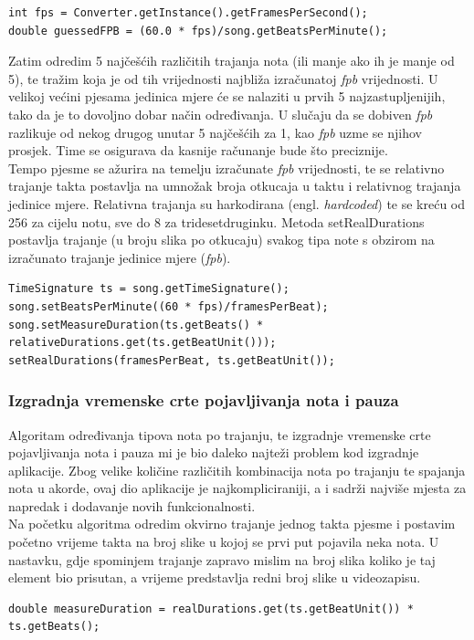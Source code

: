 \documentclass[times, utf8, zavrsni, numeric]{fer}
\begin{document}
\begin{lstlisting}
int fps = Converter.getInstance().getFramesPerSecond();
double guessedFPB = (60.0 * fps)/song.getBeatsPerMinute();
\end{lstlisting}

Zatim odredim 5 najčešćih različitih trajanja nota (ili manje ako ih je manje od 5), te tražim koja je od tih vrijednosti najbliža izračunatoj \textit{fpb} vrijednosti. U velikoj većini pjesama jedinica mjere će se nalaziti u prvih 5 najzastupljenijih, tako da je to dovoljno dobar način određivanja. U slučaju da se dobiven \textit{fpb} razlikuje od nekog drugog unutar 5 najčešćih za 1, kao \textit{fpb} uzme se njihov prosjek. Time se osigurava da kasnije računanje bude što preciznije.\\

Tempo pjesme se ažurira na temelju izračunate \textit{fpb} vrijednosti, te se relativno trajanje takta postavlja na umnožak broja otkucaja u taktu i relativnog trajanja jedinice mjere. Relativna trajanja su harkodirana (engl. \textit{hardcoded}) te se kreću od 256 za cijelu notu, sve do 8 za tridesetdruginku. Metoda setRealDurations postavlja trajanje (u broju slika po otkucaju) svakog tipa note s obzirom na izračunato trajanje jedinice mjere (\textit{fpb}).

\begin{lstlisting}
TimeSignature ts = song.getTimeSignature();
song.setBeatsPerMinute((60 * fps)/framesPerBeat);
song.setMeasureDuration(ts.getBeats() * relativeDurations.get(ts.getBeatUnit()));
setRealDurations(framesPerBeat, ts.getBeatUnit());
\end{lstlisting}

\subsubsection{Izgradnja vremenske crte pojavljivanja nota i pauza}
Algoritam određivanja tipova nota po trajanju, te izgradnje vremenske crte pojavljivanja nota i pauza mi je bio daleko najteži problem kod izgradnje aplikacije. Zbog velike količine različitih kombinacija nota po trajanju te spajanja nota u akorde, ovaj dio aplikacije je najkompliciraniji, a i sadrži najviše mjesta za napredak i dodavanje novih funkcionalnosti.\\

Na početku algoritma odredim okvirno trajanje jednog takta pjesme i postavim početno vrijeme takta na broj slike u kojoj se prvi put pojavila neka nota. U nastavku, gdje spominjem trajanje zapravo mislim na broj slika koliko je taj element bio prisutan, a vrijeme predstavlja redni broj slike u videozapisu.
\begin{lstlisting}
double measureDuration = realDurations.get(ts.getBeatUnit()) * ts.getBeats();
\end{lstlisting}
\end{document}
